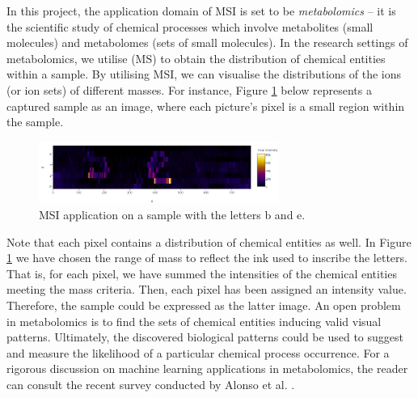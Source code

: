 \documentclass{mprop}
\begin{document}
\par In this project, the application domain of MSI is set to be \textit{metabolomics} -- it is the scientific study of chemical processes which involve metabolites (small molecules) and metabolomes (sets of small molecules). In the research settings of metabolomics, we utilise  (MS) to obtain the distribution of chemical entities within a sample. By utilising MSI, we can visualise the distributions of the ions (or ion sets) of different masses. For instance, Figure \ref{fig:b_and_e} below represents a captured sample as an image, where each picture's pixel is a small region within the sample. 
\begin{figure}[H]
  \centering
  \includegraphics[width=0.7\textwidth]{b_and_e}
  \caption{MSI application on a sample with the letters b and e.}
  \label{fig:b_and_e}
\end{figure}
Note that each pixel contains a distribution of chemical entities as well. In Figure \ref{fig:b_and_e} we have chosen the range of mass to reflect the ink used to inscribe the letters. That is, for each pixel, we have summed the intensities of the chemical entities meeting the mass criteria. Then, each pixel has been assigned an intensity value. Therefore, the sample could be expressed as the latter image. An open problem in metabolomics is to find the sets of chemical entities inducing valid visual patterns. Ultimately, the discovered biological patterns could be used to suggest and measure the likelihood of a particular chemical process occurrence. For a rigorous discussion on machine learning applications in metabolomics, the reader can consult the recent survey conducted by Alonso et al. \cite{alonso-et-al}.


\end{document}
